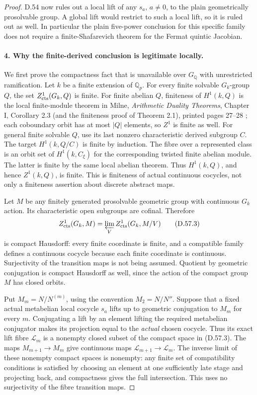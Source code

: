 \begin{proof}
D.54 now rules out a local lift of any $s_a$, $a\ne0$, to the
plain geometrically prosolvable group.  A global lift would
restrict to such a local lift, so it is ruled out as well.
In particular the plain five-power conclusion for this
specific family does not require a finite-Shafarevich theorem
for the Fermat quintic Jacobian.

\paragraph{4. Why the finite-derived conclusion is legitimate locally.}

We first prove the compactness fact that is unavailable over
$G_{\mathbb Q}$ with unrestricted ramification.  Let $k$ be a
finite extension of $\mathbb Q_p$.  For every finite solvable
$G_k$-group $Q$, the set $Z^1_{\rm cts}(G_k,Q)$ is finite.
For finite abelian $Q$, finiteness of $H^1(k,Q)$ is the local
finite-module theorem in Milne, \emph{Arithmetic Duality
Theorems}, Chapter I, Corollary 2.3 (and the finiteness proof
of Theorem 2.1), printed pages 27--28 \cite{DE_MilneADT}; each coboundary orbit has at
most $|Q|$ elements, so $Z^1$ is finite as well.  For general
finite solvable $Q$, use its last nonzero characteristic
derived subgroup $C$.  The target $H^1(k,Q/C)$ is finite by
induction.  The fibre over a represented class is an orbit
set of $H^1(k,C_\xi)$ for the corresponding twisted finite
abelian module.  The latter is finite by the same local
abelian theorem.  Thus $H^1(k,Q)$, and hence $Z^1(k,Q)$, is
finite.  This is finiteness of actual continuous cocycles,
not only a finiteness assertion about discrete abstract maps.

Let $M$ be any finitely generated prosolvable geometric group
with continuous $G_k$ action.  Its characteristic open
subgroups are cofinal.  Therefore
\[
 Z^1_{\rm cts}(G_k,M)
       =\varprojlim_V Z^1_{\rm cts}(G_k,M/V)             \tag{D.57.3}
\]
is compact Hausdorff: every finite coordinate is finite, and
a compatible family defines a continuous cocycle because
each finite coordinate is continuous.  Surjectivity of the
transition maps is not being assumed.  Quotient by geometric
conjugation is compact Hausdorff as well, since the action of
the compact group $M$ has closed orbits.

Put $M_m=N/N^{(m)}$, using the convention $M_2=N/N''$.
Suppose that a fixed actual metabelian local cocycle $s_a$
lifts up to geometric conjugation to $M_m$ for every $m$.
Conjugating a lift by an element lifting the required
metabelian conjugator makes its projection equal to the
\emph{actual} chosen cocycle.  Thus its exact lift fibre
$\mathcal L_m$ is a nonempty closed subset of the compact
space in (D.57.3).  The maps $M_{m+1}\to M_m$ give continuous
maps $\mathcal L_{m+1}\to\mathcal L_m$.  The inverse limit
of these nonempty compact spaces is nonempty: any finite
set of compatibility conditions is satisfied by choosing
an element at one sufficiently late stage and projecting
back, and compactness gives the full intersection.  This
uses no surjectivity of the fibre transition maps.


\end{proof}
